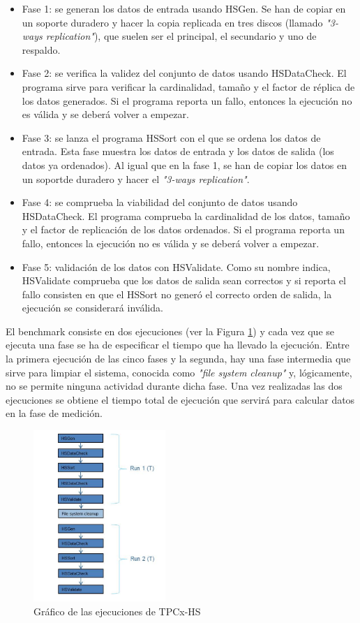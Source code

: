 \documentclass[10pt]{article}
\begin{document}
		\begin{itemize}
			\item Fase 1: se generan los datos de entrada usando HSGen. Se han de copiar en un soporte duradero y hacer la copia replicada en tres discos (llamado \textit{"3-ways replication"}), que suelen ser el principal, el secundario y uno de respaldo\cite{replication}.
			\item Fase 2: se verifica la validez del conjunto de datos usando HSDataCheck. El programa sirve para verificar la cardinalidad, tamaño y el factor de réplica de los datos generados. Si el programa reporta un fallo, entonces la ejecución no es válida y se deberá volver a empezar.
			\item Fase 3: se lanza el programa HSSort con el que se ordena los datos de entrada. Esta fase muestra los datos de entrada y los datos de salida (los datos ya ordenados). Al igual que en la fase 1, se han de copiar los datos en un soportde duradero y hacer el \textit{"3-ways replication"}.
			\item Fase 4: se comprueba la viabilidad del conjunto de datos usando HSDataCheck. El programa comprueba la cardinalidad de los datos, tamaño y el factor de replicación de los datos ordenados. Si el programa reporta un fallo, entonces la ejecución no es válida y se deberá volver a empezar.
			\item Fase 5: validación de los datos con HSValidate. Como su nombre indica, HSValidate comprueba que los datos de salida sean correctos y si reporta el fallo consisten en que el HSSort no generó el correcto orden de salida, la ejecución se considerará inválida.
		\end{itemize}
		
		El benchmark consiste en dos ejecuciones (ver la Figura \ref{fig:ejecucionesTPC}) y cada vez que se ejecuta una fase se ha de especificar el tiempo que ha llevado la ejecución. Entre la primera ejecución de las cinco fases y la segunda, hay una fase intermedia que sirve para limpiar el sistema, conocida como \textit{"file system cleanup"} y, lógicamente, no se permite ninguna actividad durante dicha fase. Una vez realizadas las dos ejecuciones se obtiene el tiempo total de ejecución que servirá para calcular datos en la fase de medición.
		
		\begin{figure}[h]
			 \centering
			 \includegraphics[width=5cm]{./images/executionsTPC.png}
			 \caption{Gráfico de las ejecuciones de TPCx-HS} 
			 \label{fig:ejecucionesTPC}
		\end{figure}
		
\end{document}
